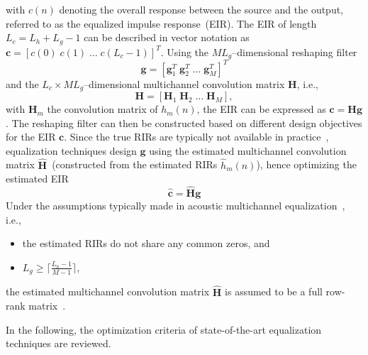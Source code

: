 \documentclass[11pt,draftcls,onecolumn]{IEEEtran}
\begin{document}
with $c(n)$ denoting the overall response between the source and the output, referred to as the equalized impulse response~(EIR).
The EIR of length $L_c = L_h+L_g-1$ can be described in vector notation as $\mathbf{c} = \left[c(0) \; c(1) \; \ldots \; c(L_c-1) \right]^{T}$.
Using the $ML_g$--dimensional reshaping filter 
\begin{equation}
\mathbf{g}  =  \left[\mathbf{g}_1^T \; \mathbf{g}_2^T \; \ldots \; \mathbf{g}_M^T \right]^T
\end{equation}
and the $L_c \times ML_g$--dimensional multichannel convolution matrix $\mathbf{H}$, i.e.,
\begin{equation}
\mathbf{H} = \left[\mathbf{H}_1 \; \mathbf{H}_2 \; \ldots \; \mathbf{H}_M \right],
\end{equation}
with $\mathbf{H}_m$ the convolution matrix of $h_m(n)$, the EIR can be expressed as $\mathbf{c} = \mathbf{H}\mathbf{g}$.
The reshaping filter can then be constructed based on different design objectives for the EIR $\mathbf{c}$.
Since the true RIRs are typically not available in practice~\cite{Radlovic_ITSA_2000,Hasan_EUSIPCO_2006,Lin_ITASLP_2012}, equalization techniques design $\mathbf{g}$ using the estimated multichannel convolution matrix $\hat{\mathbf{H}}$~(constructed from the estimated RIRs $\hat{h}_m(n)$), hence optimizing the estimated EIR
\begin{equation}
\boxed{\hat{\mathbf{c}} = \hat{\mathbf{H}}\mathbf{g}}
\end{equation}
Under the assumptions typically made in acoustic multichannel equalization~\cite{Miyoshi_ITASS_1988}, i.e., 
\begin{itemize}
  \item the estimated RIRs do not share any common zeros, and
  \item $L_g \geq \lceil{\frac{L_h-1}{M-1}\rceil}$,
\end{itemize}
the estimated multichannel convolution matrix $\hat{\mathbf{H}}$ is assumed to be a full row-rank matrix~\cite{Harikumar_ITSP_1998}.

In the following, the optimization criteria of state-of-the-art equalization techniques are reviewed.
\end{document}
